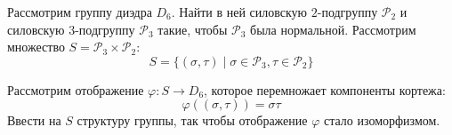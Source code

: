 

\cfoot{}



\begin{exercise}
    Рассмотрим группу диэдра \(D_6\). Найти в ней силовскую \(2\)-подгруппу \(\mathcal{P}_2\) и силовскую \(3\)-подгруппу \(\mathcal{P}_3\) такие, чтобы \(\mathcal{P}_3\) была нормальной. Рассмотрим множество \(S = \mathcal{P}_3 \times \mathcal{P}_2\):
    \[S = \{(\sigma, \tau) \mid \sigma \in \mathcal{P}_3, \tau \in \mathcal{P}_2\}\]

    Рассмотрим отображение \(\varphi : S \to D_6\), которое перемножает компоненты кортежа:
    \[\varphi((\sigma, \tau)) = \sigma\tau\]
    Ввести на \(S\) структуру группы, так чтобы отображение \(\varphi\) стало изоморфизмом.
\end{exercise}

